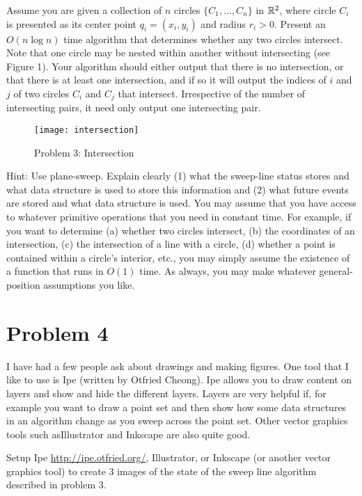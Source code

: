 \documentclass[11pt]{article}
\begin{document}
Assume you are given a collection of $n$ circles $\{C_1 , \ldots , C_n \}$ in
$\mathbb{R}^2$, where circle $C_i$ is presented as its center point $q_i = (x_i, y_i)$
and radius $r_i > 0$. Present an $O(n \log n)$ time algorithm that determines
whether any two circles intersect. Note that one circle may be nested within
another without intersecting (see Figure 1). Your algorithm should either output
that there is no intersection, or that there is at least one intersection, and
if so it will output the indices of $i$ and $j$ of two circles $C_i$ and $C_j$
that intersect. Irrespective of the number of intersecting pairs, it need only
output one intersecting pair.

\begin{figure}[h]
    \centering
    \texttt{[image: intersection]}
    \caption{Problem 3: Intersection}
\end{figure}

Hint: Use plane-sweep. Explain clearly (1) what the sweep-line status stores and
what data structure is used to store this information and (2) what future events
are stored and what data structure is used. You may assume that you have access
to whatever primitive operations that you need in constant time. For example, if
you want to determine (a) whether two circles intersect, (b) the coordinates of
an intersection, (c) the intersection of a line with a circle, (d) whether a
point is contained within a circle's interior, etc., you may simply assume the
existence of a function that runs in $O(1)$ time. As always, you may make
whatever general-position assumptions you like.

\newpage
\section*{Problem 4}

I have had a few people ask about drawings and making figures.  One tool that I
like to use is Ipe (written by Otfried Cheong).  Ipe allows you to draw content
on layers and show and hide the different layers.  Layers are very helpful if,
for example you want to draw a point set and then show how some data structures
in an algorithm change as you sweep across the point set.
Other vector graphics tools such asIllustrator and Inkscape are also quite good.

Setup Ipe \url{http://ipe.otfried.org/}, Illustrator, or Inkscape
(or another vector graphics tool)
to create 3 images of the state of the sweep line algorithm
described in problem 3.

%
%
\end{document}
